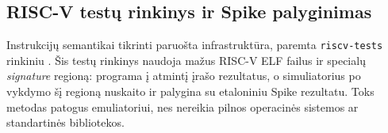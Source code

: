 \subsection{RISC-V testų rinkinys ir Spike palyginimas}
\label{sec:riscv-tests-ir-spike}

Instrukcijų semantikai tikrinti paruošta infrastruktūra, paremta \texttt{riscv-tests} rinkiniu \cite{riscv-tests}. Šis testų rinkinys naudoja mažus RISC-V ELF failus ir specialų \textit{signature} regioną: programa į atmintį įrašo rezultatus, o simuliatorius po vykdymo šį regioną nuskaito ir palygina su etaloniniu Spike rezultatu. Toks metodas patogus emuliatoriui, nes nereikia pilnos operacinės sistemos ar standartinės bibliotekos.
